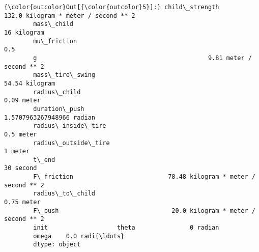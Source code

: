 \documentclass[11pt]{article}
\begin{document}
\begin{Verbatim}[commandchars=\\\{\}]
{\color{outcolor}Out[{\color{outcolor}5}]:} child\_strength                      132.0 kilogram * meter / second ** 2
        mass\_child                                                   16 kilogram
        mu\_friction                                                          0.5
        g                                               9.81 meter / second ** 2
        mass\_tire\_swing                                           54.54 kilogram
        radius\_child                                                  0.09 meter
        duration\_push                                  1.5707963267948966 radian
        radius\_inside\_tire                                             0.5 meter
        radius\_outside\_tire                                              1 meter
        t\_end                                                          30 second
        F\_friction                          78.48 kilogram * meter / second ** 2
        radius\_to\_child                                               0.75 meter
        F\_push                               20.0 kilogram * meter / second ** 2
        init                   theta               0 radian
        omega    0.0 radi{\ldots}
        dtype: object
\end{Verbatim}
            
\end{document}
